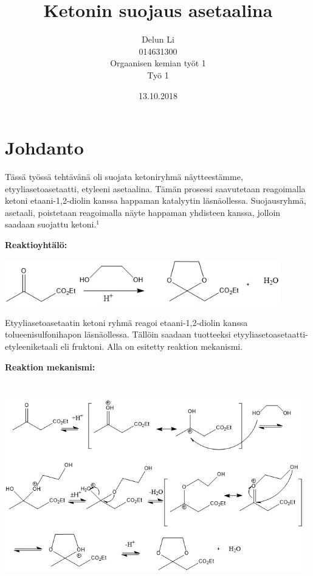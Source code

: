 \documentclass[11pt,a4paper]{article}
\title{Ketonin suojaus asetaalina}
\author{Delun Li\\014631300\\Orgaanisen kemian työt 1\\Työ 1}
\date{13.10.2018}
\begin{document}
\maketitle

\pagebreak


\section{Johdanto}

Tässä työssä tehtävänä oli suojata ketoniryhmä näytteestämme, etyyliasetoasetaatti, etyleeni asetaalina. Tämän prosessi saavutetaan reagoimalla ketoni etaani-1,2-diolin kanssa happaman katalyytin läsnäollessa. Suojausryhmä, asetaali, poistetaan reagoimalla näyte happaman yhdisteen kanssa, jolloin saadaan suojattu ketoni.$^1$ 

\vspace{0.5cm}

\noindent \textbf{Reaktioyhtälö:}

\vspace{0.3cm}


\includegraphics[width=12cm, height=2cm]{yht.jpg}

\vspace{0.3cm}

\noindent Etyyliasetoasetaatin ketoni ryhmä reagoi etaani-1,2-diolin kanssa tolueenisulfonihapon läsnäollessa. Tällöin saadaan tuotteeksi etyyliasetoasetaatti-etyleeniketaali eli fruktoni. Alla on esitetty reaktion mekanismi. 

\noindent \textbf{Reaktion mekanismi:}

\vspace{0.3cm}

\hspace{-1cm}\includegraphics[width=13cm, height=9cm]{mek.jpg}
\end{document}
